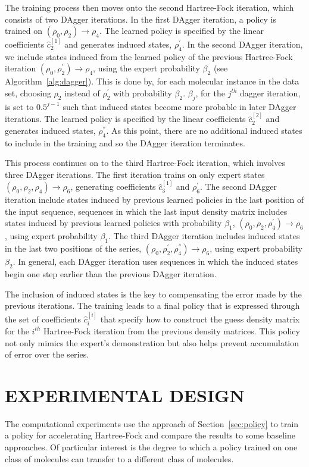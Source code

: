\documentclass[twoside,11pt]{article}
\begin{document}
The training process then moves onto the second Hartree-Fock iteration, which consists of two DAgger iterations. In the first DAgger iteration, a policy is trained on $(\rho_0, \rho_2) \rightarrow \rho_4$. The learned policy is specified by the linear coefficients $\hat{c}^{[1]}_2$ and generates induced states, $\rho_4^{'}$. In the second DAgger iteration, we include states induced from the learned policy of the previous Hartree-Fock iteration $(\rho_0, \rho_2^{'}) \rightarrow \rho_4$, using the expert probability $\beta_2$ (see Algorithm~\ref{alg:dagger}). This is done by, for each molecular instance in the data set, choosing $\rho_2$ instead of $\rho_2^{'}$ with probability $\beta_2$. $\beta_j$, for the $j^{th}$ dagger iteration, is set to $0.5^{j-1}$ such that induced states become more probable in later DAgger iterations. The learned policy is specified by the linear coefficients $\hat{c}^{[2]}_2$ and generates induced states, $\rho_4^{''}$. As this point, there are no additional induced states to include in the training and so the DAgger iteration terminates.

This process continues on to the third Hartree-Fock iteration, which involves three DAgger iterations. The first iteration trains on only expert states $(\rho_0, \rho_2, \rho_4) \rightarrow \rho_6$, generating coefficients $\hat{c}^{[1]}_3$ and $\rho_6^{'}$. The second DAgger iteration include states induced by previous learned policies in the last position of the input sequence, sequences in which the last input density matrix includes states induced by previous learned policies with probability $\beta_1$, $(\rho_0, \rho_2, \rho_4^{'}) \rightarrow \rho_6$, using expert probability $\beta_1$. The third DAgger iteration includes induced states in the last two positions of the series,  $(\rho_0, \rho_2^{'}, \rho_{4}^{''}) \rightarrow \rho_6$, using expert probability $\beta_2$. In general, each DAgger iteration uses sequences in which the induced states begin one step earlier than the previous DAgger iteration. 

The inclusion of induced states is the key to compensating the error made by the previous iterations. The training leads to a final policy that is expressed through the set of coefficients $\hat{c}^{[i]}_i$ that specify how to construct the guess density matrix for the $i^{th}$ Hartree-Fock iteration from the previous density matrices. This policy not only mimics the expert's demonstration but also helps prevent accumulation of error over the series.

\section{EXPERIMENTAL DESIGN}\label{sec:exp}
The computational experiments use the approach of Section~\ref{sec:policy} to train a policy for accelerating Hartree-Fock and compare the results to some baseline approaches. Of particular interest is the degree to which a policy trained on one class of molecules can transfer to a different class of molecules.
\end{document}
